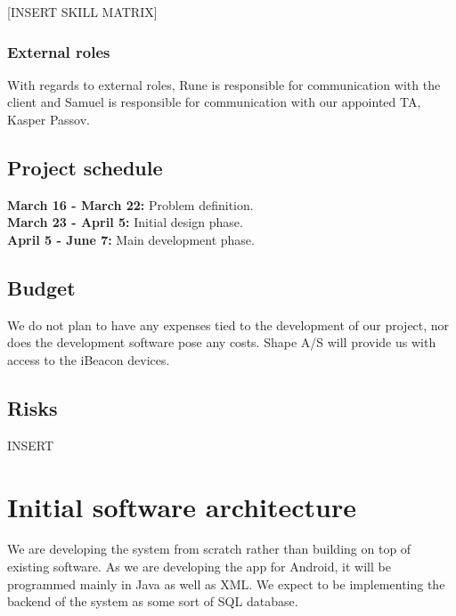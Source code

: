 \documentclass[12pt]{article}
\begin{document}
[INSERT SKILL MATRIX]\\


\subsubsection{External roles}
With regards to external roles, Rune is responsible for communication with the client and Samuel is responsible for communication with our appointed TA, Kasper Passov.\\



\subsection{Project schedule}
\textbf{March 16 - March 22:} Problem definition.\\
\textbf{March 23 - April 5:} Initial design phase.\\
\textbf{April 5 - June 7:} Main development phase.\\



\subsection{Budget}
We do not plan to have any expenses tied to the development of our project, nor does the development software pose any costs. Shape A/S will provide us with access to the iBeacon devices.\\


\subsection{Risks}
INSERT\\










\section{Initial software architecture}

We are developing the system from scratch rather than building on top of existing software. As we are developing the app for Android, it will be programmed mainly in Java as well as XML. We expect to be implementing the backend of the system as some sort of SQL database.\\
\end{document}
